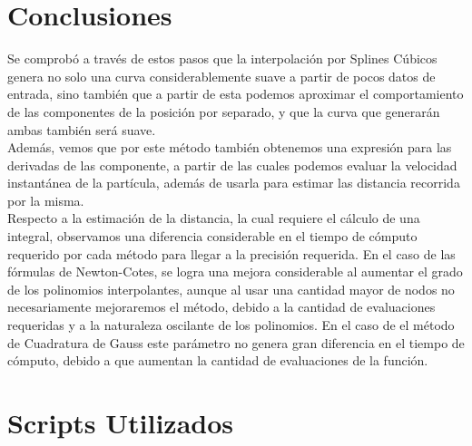 \documentclass{article}
\begin{document}
    \section{Conclusiones}
    Se comprobó a través de estos pasos que la interpolación por Splines Cúbicos genera no solo una curva considerablemente suave a partir de pocos datos de entrada, sino también que a partir de esta podemos aproximar el comportamiento de las componentes de la posición por separado, y que la curva que generarán ambas también será suave.\\
    \indent Además, vemos que por este método también obtenemos una expresión para las derivadas de las componente, a partir de las cuales podemos evaluar la velocidad instantánea de la partícula, además de usarla para estimar las distancia recorrida por la misma.\\
    \indent Respecto a la estimación de la distancia, la cual requiere el cálculo de una integral, observamos una diferencia considerable en el tiempo de cómputo requerido por cada método para llegar a la precisión requerida. En el caso de las fórmulas de Newton-Cotes, se logra una mejora considerable al aumentar el grado de los polinomios interpolantes, aunque al usar una cantidad mayor de nodos no necesariamente mejoraremos el método, debido a la cantidad de evaluaciones requeridas y a la naturaleza oscilante de los polinomios. En el caso de el método de Cuadratura de Gauss este parámetro no genera gran diferencia en el tiempo de cómputo, debido a que aumentan la cantidad de evaluaciones de la función.

    \section{Scripts Utilizados}
\end{document}
